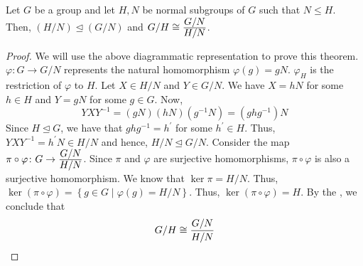 \begin{theorem} \label{thm:iso3}
    Let $G$ be a group and let $H,N$ be normal subgroups of $G$ such that $N \leq H$. Then, $(H/N) \trianglelefteq (G/N)$ and $G/H \cong \frac{\displaystyle G/N}{\displaystyle H/N}$.
\end{theorem}
\begin{center}
\end{center}
\begin{proof}
    We will use the above diagrammatic representation to prove this theorem. $\varphi \colon G \to G/N$ represents the natural homomorphism $\varphi(g) = gN$. $\varphi_H$ is the restriction of $\varphi$ to $H$. Let $X \in H/N$ and $Y \in G/N$. We have $X = hN$ for some $h \in H$ and $Y = gN$ for some $g \in G$. Now,
    \[
        YXY^{-1} = (gN)(hN)(g^{-1}N) = (ghg^{-1})N
    \]
    Since $H \trianglelefteq G$, we have that $ghg^{-1} = h^{\prime}$ for some $h^{\prime} \in H$. Thus, $YXY^{-1} = h^{\prime} N \in H/N$ and hence, $H/N \trianglelefteq G/N$. Consider the map $\pi \circ \varphi \colon G \to \frac{\displaystyle G/N}{\displaystyle H/N}$. Since $\pi$ and $\varphi$ are surjective homomorphisms, $\pi \circ \varphi$ is also a surjective homomorphism. We know that $\ker\pi = H/N$. Thus, $\ker(\pi\circ\varphi) = \left\{ g \in G \mid \varphi(g) = H/N \right\}$. Thus, $\ker(\pi\circ\varphi) = H$. By the , we conclude that
    \[
        G/H \cong \frac{G/N}{H/N} \qedhere
    \]
\end{proof}


